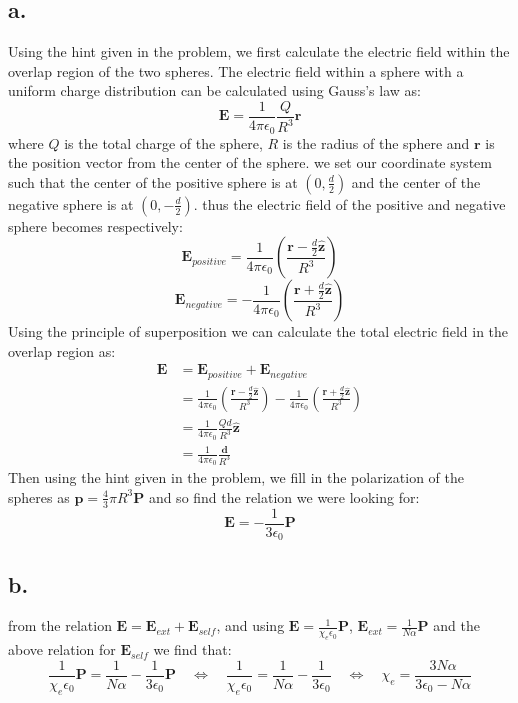 \documentclass[11pt,a4paper]{article}
\begin{document}
\subsection*{a.}
Using the hint given in the problem, we first calculate the electric field within the overlap region of the two spheres. The electric field within a sphere with a uniform charge distribution can be calculated using Gauss's law as:
\[\mathbf{E} = \frac{1}{4\pi\epsilon_0}\frac{Q}{R^3}\mathbf{r}\]
where $Q$ is the total charge of the sphere, $R$ is the radius of the sphere and $\mathbf{r}$ is the position vector from the center of the sphere. we set our coordinate system such that the center of the positive sphere is at $(0,\frac{d}{2})$ and the center of the negative sphere is at $(0,-\frac{d}{2})$. thus the electric field of the positive and negative sphere becomes respectively:
\[\mathbf{E}_{positive} = \frac{1}{4\pi\epsilon_0}\left(\frac{\mathbf{r}-\frac{d}{2}\hat{\mathbf{z}}}{R^3}\right)\]
\[\mathbf{E}_{negative} = -\frac{1}{4\pi\epsilon_0}\left(\frac{\mathbf{r}+\frac{d}{2}\hat{\mathbf{z}}}{R^3}\right)\]
Using the principle of superposition we can calculate the total electric field in the overlap region as:   
\begin{align*}
\mathbf{E} &= \mathbf{E}_{positive} + \mathbf{E}_{negative}\\
&= \frac{1}{4\pi\epsilon_0}\left(\frac{\mathbf{r}-\frac{d}{2}\hat{\mathbf{z}}}{R^3}\right) - \frac{1}{4\pi\epsilon_0}\left(\frac{\mathbf{r}+\frac{d}{2}\hat{\mathbf{z}}}{R^3}\right)\\
&= \frac{1}{4\pi\epsilon_0}\frac{Qd}{R^3}\hat{\mathbf{z}}\\
&= \frac{1}{4\pi\epsilon_0}\frac{\mathbf{d}}{R^3}
\end{align*}
Then using the hint given in the problem, we fill in the polarization of the spheres as $\mathbf{p} = \frac{4}{3}\pi R^3\mathbf{P}$  and so find the relation we were looking for:
\[\mathbf{E} = -\frac{1}{3\epsilon_0}\mathbf{P}\]
\subsection*{b.}
from the relation $\mathbf{E}=\mathbf{E}_{ext}+\mathbf{E}_{self}$, and using $\mathbf{E}=\frac{1}{\chi_e \epsilon_0}\mathbf{P}$, $\mathbf{E}_{ext}=\frac{1}{N\alpha}\mathbf{P}$ and the above relation for $\mathbf{E}_{self}$ we find that:
\[
\frac{1}{\chi_e \epsilon_0}\mathbf{P} = \frac{1}{N\alpha} - \frac{1}{3\epsilon_0}\mathbf{P}
\quad \Leftrightarrow \quad \frac{1}{\chi_e \epsilon_0} = \frac{1}{N\alpha} - \frac{1}{3\epsilon_0}
\quad \Leftrightarrow \quad \boxed{\chi_e = \frac{3N\alpha}{3\epsilon_0 - N\alpha}}
\]
\end{document}
